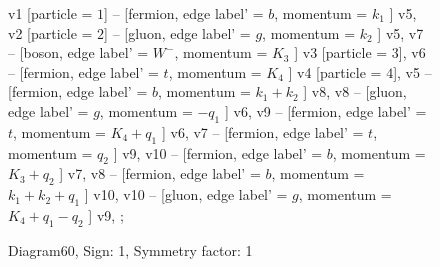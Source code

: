 \documentclass{revtex4}
\begin{document}
\begin{figure}[!htb]
\begin{center}
{    %
v1 [particle = \(1\)] -- [fermion, edge label' = \(b\), momentum = \(k_{1}\) ] v5, 
v2 [particle = \(2\)] -- [gluon, edge label' = \(g\), momentum = \(k_{2}\) ] v5, 
v7 -- [boson, edge label' = \(W^{-}\), momentum = \(K_{3}\) ] v3 [particle = \(3\)], 
v6 -- [fermion, edge label' = \(t\), momentum = \(K_{4}\) ] v4 [particle = \(4\)], 
v5 -- [fermion, edge label' = \(b\), momentum = \(k_{1} + k_{2}\) ] v8, 
v8 -- [gluon, edge label' = \(g\), momentum = \(-q_{1}\) ] v6, 
v9 -- [fermion, edge label' = \(t\), momentum = \(K_{4} + q_{1}\) ] v6, 
v7 -- [fermion, edge label' = \(t\), momentum = \(q_{2}\) ] v9, 
v10 -- [fermion, edge label' = \(b\), momentum = \(K_{3} + q_{2}\) ] v7, 
v8 -- [fermion, edge label' = \(b\), momentum = \(k_{1} + k_{2} + q_{1}\) ] v10, 
v10 -- [gluon, edge label' = \(g\), momentum = \(K_{4} + q_{1} - q_{2}\) ] v9, 
};
\end{center}
\caption{Diagram60, Sign: 1, Symmetry factor: 1}
\end{figure}
\newpage
\end{document}
